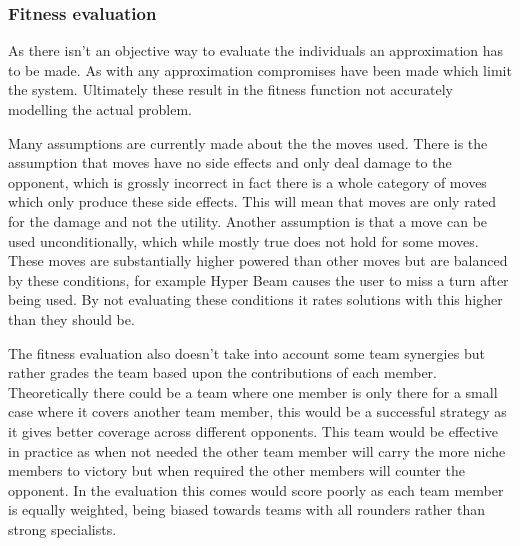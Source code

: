 \documentclass[a4paper]{article}
\begin{document}
\subsubsection{Fitness evaluation}
\par
As there isn't an objective way to evaluate the individuals an approximation has to be made.
As with any approximation compromises have been made which limit the system.
Ultimately these result in the fitness function not accurately modelling the actual problem.
\par
Many assumptions are currently made about the the moves used.
There is the assumption that moves have no side effects and only deal damage to the opponent, which is grossly incorrect in fact there is a whole category of moves which only produce these side effects.
This will mean that moves are only rated for the damage and not the utility.
Another assumption is that a move can be used unconditionally, which while mostly true does not hold for some moves.
These moves are substantially higher powered than other moves but are balanced by these conditions, for example Hyper Beam causes the user to miss a turn after being used.
By not evaluating these conditions it rates solutions with this higher than they should be.
\par
The fitness evaluation also doesn't take into account some team synergies but rather grades the team based upon the contributions of each member.
Theoretically there could be a team where one member is only there for a small case where it covers another team member, this would be a successful strategy as it gives better coverage across different opponents.
This team would be effective in practice as when not needed the other team member will carry the more niche members to victory but when required the other members will counter the opponent.
In the evaluation this comes would score poorly as each team member is equally weighted, being biased towards teams with all rounders rather than strong specialists.
\end{document}
